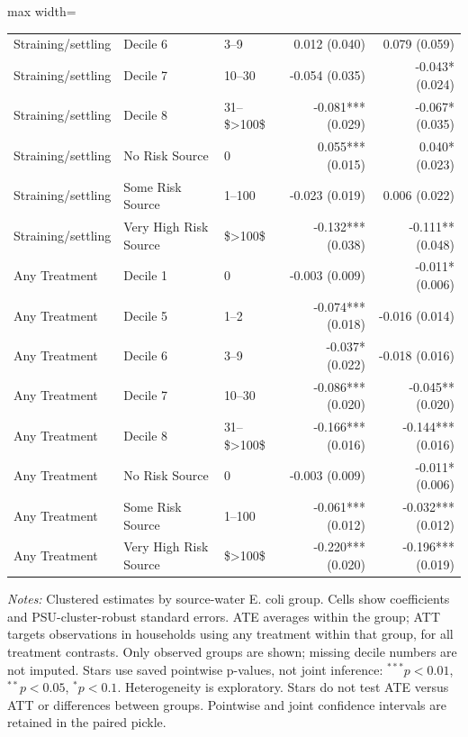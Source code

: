 \begin{table}[htbp]
\begin{adjustbox}{max width=\linewidth}
\begin{tabular}{lllrr}
Straining/settling & Decile 6 & 3--9 & 0.012 (0.040) & 0.079 (0.059) \\
Straining/settling & Decile 7 & 10--30 & -0.054 (0.035) & -0.043* (0.024) \\
Straining/settling & Decile 8 & 31--\$\textgreater{}100\$ & -0.081*** (0.029) & -0.067* (0.035) \\
Straining/settling & No Risk Source & 0 & 0.055*** (0.015) & 0.040* (0.023) \\
Straining/settling & Some Risk Source & 1--100 & -0.023 (0.019) & 0.006 (0.022) \\
Straining/settling & Very High Risk Source & \$\textgreater{}100\$ & -0.132*** (0.038) & -0.111** (0.048) \\
Any Treatment & Decile 1 & 0 & -0.003 (0.009) & -0.011* (0.006) \\
Any Treatment & Decile 5 & 1--2 & -0.074*** (0.018) & -0.016 (0.014) \\
Any Treatment & Decile 6 & 3--9 & -0.037* (0.022) & -0.018 (0.016) \\
Any Treatment & Decile 7 & 10--30 & -0.086*** (0.020) & -0.045** (0.020) \\
Any Treatment & Decile 8 & 31--\$\textgreater{}100\$ & -0.166*** (0.016) & -0.144*** (0.016) \\
Any Treatment & No Risk Source & 0 & -0.003 (0.009) & -0.011* (0.006) \\
Any Treatment & Some Risk Source & 1--100 & -0.061*** (0.012) & -0.032*** (0.012) \\
Any Treatment & Very High Risk Source & \$\textgreater{}100\$ & -0.220*** (0.020) & -0.196*** (0.019) \\
\bottomrule
\end{tabular}
\end{adjustbox}
\par\vspace{3pt}\begin{minipage}{\linewidth}\scriptsize\textit{Notes:} Clustered estimates by source-water E. coli group. Cells show coefficients and PSU-cluster-robust standard errors. ATE averages within the group; ATT targets observations in households using any treatment within that group, for all treatment contrasts. Only observed groups are shown; missing decile numbers are not imputed. Stars use saved pointwise p-values, not joint inference: $^{***}p<0.01$, $^{**}p<0.05$, $^{*}p<0.1$. Heterogeneity is exploratory. Stars do not test ATE versus ATT or differences between groups. Pointwise and joint confidence intervals are retained in the paired pickle.\end{minipage}
\end{table}
